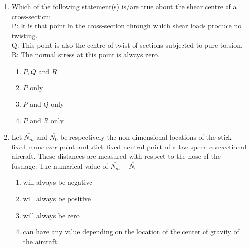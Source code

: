 \documentclass[journal,12pt,onecolumn]{IEEEtran}
\theoremstyle{remark}
\begin{document}
\begin{enumerate}[start=1]
\item Which of the following statement(s) is/are true about the shear centre of a cross-section:\\
	P: It is that point in the cross-section through which shear loads produce no twisting.\\
	Q: This point is also the centre of twist of sections subjected to pure torsion.\\
	R: The normal stress at this point is always zero.\\
	\begin{enumerate}
		\item $P,Q$ and $R$
		\item $P$ only
		\item $P$ and $Q$ only
		\item $P$ and $R$ only
	\end{enumerate}

\item Let $\overline{N_m}$ and $\overline{N_0}$ be respectively the non-dimensional locations of the stick-fixed maneuver point and stick-fixed neutral point of a low speed convectional aircraft. These distances are measured with respect to the nose of the fuselage. The numerical value of $\overline{N_m}-\overline{N_0}$
	\begin{enumerate}
		\item will always be negative
		\item will always be positive
		\item will always be zero
		\item can have any value depending on the location of the center of gravity of the aircraft
	\end{enumerate}
\end{enumerate}
\end{document}
